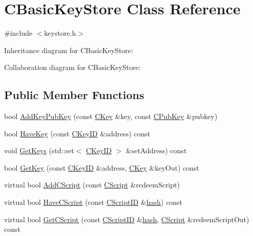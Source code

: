 \hypertarget{class_c_basic_key_store}{}\section{C\+Basic\+Key\+Store Class Reference}
\label{class_c_basic_key_store}


{\ttfamily \#include $<$keystore.\+h$>$}



Inheritance diagram for C\+Basic\+Key\+Store\+:


Collaboration diagram for C\+Basic\+Key\+Store\+:
\subsection*{Public Member Functions}
\begin{DoxyCompactItemize}
\item 
bool \hyperlink{class_c_basic_key_store_acc2e33f319de88e88f86b0dc79bdcb65}{Add\+Key\+Pub\+Key} (const \hyperlink{class_c_key}{C\+Key} \&key, const \hyperlink{class_c_pub_key}{C\+Pub\+Key} \&pubkey)
\item 
bool \hyperlink{class_c_basic_key_store_a29a60832d549913b1fa8be77b95205a5}{Have\+Key} (const \hyperlink{class_c_key_i_d}{C\+Key\+I\+D} \&address) const 
\item 
void \hyperlink{class_c_basic_key_store_a60f46db5eec334d41e5ad6e342ae2957}{Get\+Keys} (std\+::set$<$ \hyperlink{class_c_key_i_d}{C\+Key\+I\+D} $>$ \&set\+Address) const 
\item 
bool \hyperlink{class_c_basic_key_store_a3cf9b5d002a8af75e7f90ae7654a234f}{Get\+Key} (const \hyperlink{class_c_key_i_d}{C\+Key\+I\+D} \&address, \hyperlink{class_c_key}{C\+Key} \&key\+Out) const 
\item 
virtual bool \hyperlink{class_c_basic_key_store_a56249ce3540398999cd397eeb662e836}{Add\+C\+Script} (const \hyperlink{class_c_script}{C\+Script} \&redeem\+Script)
\item 
virtual bool \hyperlink{class_c_basic_key_store_a2e21398364927d920b15d3e10171cd97}{Have\+C\+Script} (const \hyperlink{class_c_script_i_d}{C\+Script\+I\+D} \&\hyperlink{cache_8cc_a11ecb029164e055f28f4123ce3748862}{hash}) const 
\item 
virtual bool \hyperlink{class_c_basic_key_store_aa7b10f974cfdc078f55fdb6adf8774a5}{Get\+C\+Script} (const \hyperlink{class_c_script_i_d}{C\+Script\+I\+D} \&\hyperlink{cache_8cc_a11ecb029164e055f28f4123ce3748862}{hash}, \hyperlink{class_c_script}{C\+Script} \&redeem\+Script\+Out) const 

\end{DoxyCompactItemize}
